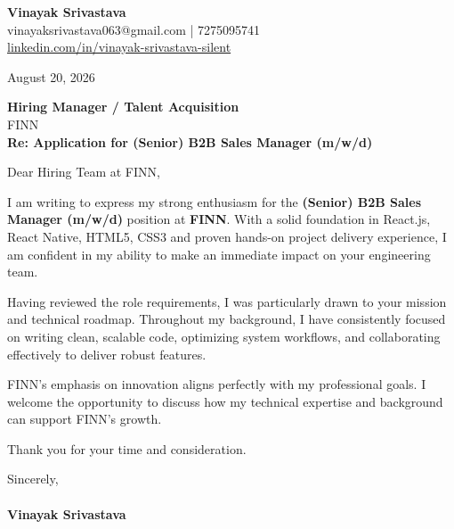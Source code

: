 \documentclass[11pt,a4paper]{article}
\begin{document}
\thispagestyle{empty}

{\Large \textbf{Vinayak Srivastava}}\\
vinayaksrivastava063@gmail.com | 7275095741 \\
\url{linkedin.com/in/vinayak-srivastava-silent}

\vspace{1em}
\hfill August 20, 2026

\textbf{Hiring Manager / Talent Acquisition}\\
FINN\\

\vspace{1.5em}
\textbf{Re: Application for (Senior) B2B Sales Manager (m/w/d)}

\vspace{1em}
Dear Hiring Team at FINN,

I am writing to express my strong enthusiasm for the \textbf{(Senior) B2B Sales Manager (m/w/d)} position at \textbf{FINN}. With a solid foundation in React.js, React Native, HTML5, CSS3 and proven hands-on project delivery experience, I am confident in my ability to make an immediate impact on your engineering team.

Having reviewed the role requirements, I was particularly drawn to your mission and technical roadmap. Throughout my background, I have consistently focused on writing clean, scalable code, optimizing system workflows, and collaborating effectively to deliver robust features.

FINN's emphasis on innovation aligns perfectly with my professional goals. I welcome the opportunity to discuss how my technical expertise and background can support FINN's growth.

Thank you for your time and consideration.

\vspace{1.5em}
Sincerely,\\
\vspace{1em}\\
\textbf{Vinayak Srivastava}
\end{document}
